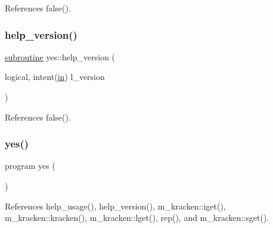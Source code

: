 References false().

\mbox{\label{__yes_8f90_a442a735af6d8522c4de7080520d5fe9a}} 
\subsubsection{\texorpdfstring{help\+\_\+version()}{help\_version()}}
{\footnotesize\ttfamily \hyperlink{M__stopwatch_83_8txt_acfbcff50169d691ff02d4a123ed70482}{subroutine} yes\+::help\+\_\+version (\begin{DoxyParamCaption}\item[{logical, intent(\hyperlink{M__journal_83_8txt_afce72651d1eed785a2132bee863b2f38}{in})}]{l\+\_\+version }\end{DoxyParamCaption})}



References false().

\mbox{\label{__yes_8f90_a5366917561a9747837d99d886f06cbd7}} 
\subsubsection{\texorpdfstring{yes()}{yes()}}
{\footnotesize\ttfamily program yes (\begin{DoxyParamCaption}{ }\end{DoxyParamCaption})}



References help\+\_\+usage(), help\+\_\+version(), m\+\_\+kracken\+::iget(), m\+\_\+kracken\+::kracken(), m\+\_\+kracken\+::lget(), rep(), and m\+\_\+kracken\+::sget().

